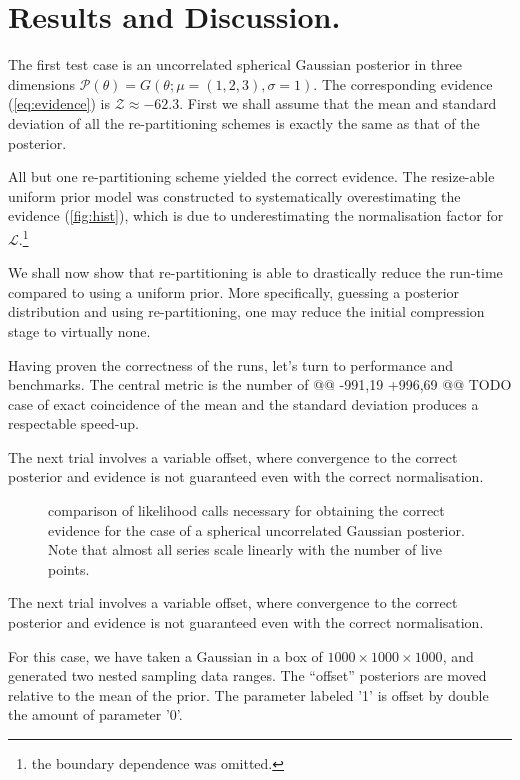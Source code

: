 \documentclass[usenatbib]{mnras}
\begin{document}
\section{Results and Discussion.}
\label{sec:org809d4a0}
The first test case is an uncorrelated spherical Gaussian posterior
in three dimensions \(\mathcal{P}(\theta) = G(\theta; \mu = (1,2,3),
  \sigma = 1)\). The corresponding evidence (\autoref{eq:evidence}) is
\(\mathcal{Z}\approx-62.3\). First we shall assume that the mean and
standard deviation of all the re-partitioning schemes is exactly the
same as that of the posterior. 

All but one re-partitioning scheme yielded the correct
evidence. The resize-able uniform prior model was constructed to
systematically overestimating the evidence (\autoref{fig:hist}),
which is due to underestimating the normalisation factor for
\(\mathcal{L}\).\footnote{the boundary dependence was omitted.}


We shall now show that re-partitioning is able to drastically reduce
the run-time compared to using a uniform prior. More specifically,
guessing a posterior distribution and using re-partitioning, one may
reduce the initial compression stage to virtually none.

     Having proven the correctness of the runs, let's turn to
   performance and benchmarks. The central metric is the number of
@@ -991,19 +996,69 @@ TODO
   case of exact coincidence of the mean and the standard deviation
   produces a respectable speed-up. 

The next trial involves a variable offset, where convergence to the
correct posterior and evidence is not guaranteed even with the
correct normalisation. 


\begin{figure}
  
\caption{\label{org2d2f1ab}
comparison of likelihood calls necessary for obtaining the correct evidence for the case of a spherical uncorrelated Gaussian posterior. Note that almost all series scale linearly with the number of live points.}
\end{figure}




The next trial involves a variable offset, where convergence to the
correct posterior and evidence is not guaranteed even with the
correct normalisation.    

For this case, we have taken a Gaussian in a box of
\(1000\times1000\times1000\), and generated two nested sampling data
ranges. The ``offset'' posteriors are moved relative to the mean of
the prior. The parameter labeled '1' is offset by double the amount
of parameter '0'. 
\end{document}
